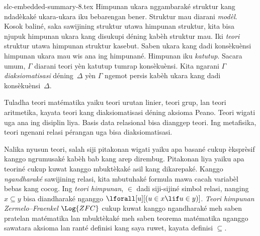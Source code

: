 \begin{filecontents*}[overwrite]{slc-embedded-summary-8.tex}
Himpunan ukara nggambaraké struktur kang ndadèkaké ukara-ukara
iku bebarengan bener. Struktur mau diarani \emph{modèl}.
Kosok baliné, saka sawijining struktur utawa himpunan struktur,
kita bisa njupuk himpunan ukara kang disukupi déning kabèh
struktur mau. Iki \emph{teori} struktur utawa himpunan struktur
kasebut. Saben ukara kang dadi konsèkuènsi himpunan ukara mau
wis ana ing himpunané. Himpunan iku \emph{katutup}. Sacara umum,
$\Gamma$ diarani teori yèn katutup tumrap konsèkuènsi. Kita
ngarani $\Gamma$ \emph{diaksiomatisasi} déning~$\Delta$ yèn
$\Gamma$ ngemot persis kabèh ukara kang dadi konsèkuènsi~$\Delta$.

Tuladha teori matématika yaiku teori urutan linier, teori grup,
lan teori aritmetika, kayata teori kang diaksiomatisasi déning
aksioma Peano. Teori wigati uga ana ing disiplin liya. Basis
data relasional bisa dianggep teori. Ing metafisika, teori
ngenani relasi pérangan uga bisa diaksiomatisasi.

Nalika nyusun teori, salah siji pitakonan wigati yaiku apa basané
cukup èksprèsif kanggo ngrumusaké kabèh bab kang arep dirembug.
Pitakonan liya yaiku apa teoriné cukup kuwat kanggo mbuktèkaké
asil kang dikarepaké. Kanggo \emph{ngandharaké} sawijining relasi,
kita mbutuhaké formula mawa cacah variabèl bebas kang cocog.
Ing \emph{teori himpunan}, $\in$ dadi siji-sijiné simbol relasi,
nanging $x\subseteq y$ bisa diandharaké nganggo
$\lforall[u][(u\in x\lif u\in y)]$. \emph{Teori himpunan
Zermelo--Fraenkel} $\Log{ZFC}$ cukup kuwat kanggo ngandharaké
meh saben pratelan matématika lan mbuktèkaké meh saben teorema
matématika nganggo sawatara aksioma lan ranté definisi kang saya
ruwet, kayata definisi $\subseteq$.
\end{filecontents*}

